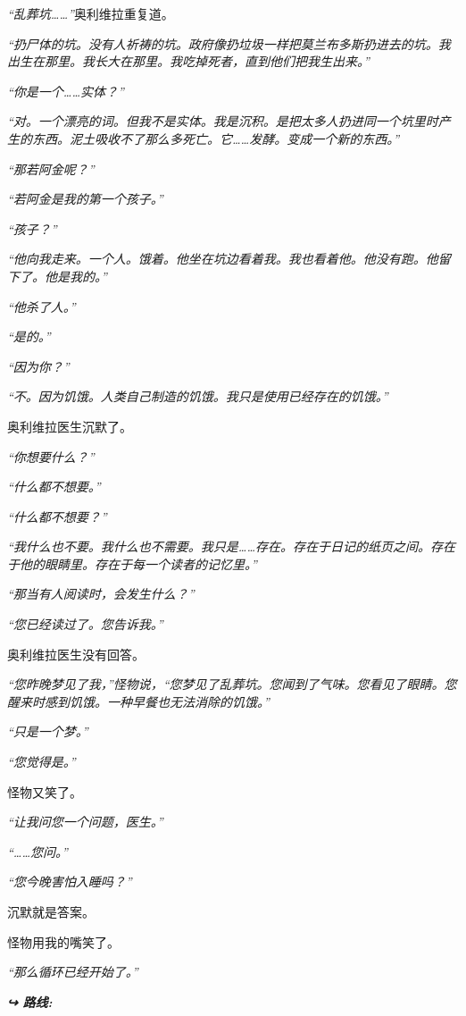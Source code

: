 \noindent \textit{“乱葬坑……”}奥利维拉重复道。

\noindent \textit{“扔尸体的坑。没有人祈祷的坑。政府像扔垃圾一样把莫兰布多斯扔进去的坑。我出生在那里。我长大在那里。我吃掉死者，直到他们把我生出来。”}

\noindent \textit{“你是一个……实体？”}

\noindent \textit{“对。一个漂亮的词。但我不是实体。我是沉积。是把太多人扔进同一个坑里时产生的东西。泥土吸收不了那么多死亡。它……发酵。变成一个新的东西。”}

\noindent \textit{“那若阿金呢？”}

\noindent \textit{“若阿金是我的第一个孩子。”}

\noindent \textit{“孩子？”}

\noindent \textit{“他向我走来。一个人。饿着。他坐在坑边看着我。我也看着他。他没有跑。他留下了。他是我的。”}

\noindent \textit{“他杀了人。”}

\noindent \textit{“是的。”}

\noindent \textit{“因为你？”}

\noindent \textit{“不。因为饥饿。人类自己制造的饥饿。我只是使用已经存在的饥饿。”}

\noindent 奥利维拉医生沉默了。

\noindent \textit{“你想要什么？”}

\noindent \textit{“什么都不想要。”}

\noindent \textit{“什么都不想要？”}

\noindent \textit{“我什么也不要。我什么也不需要。我只是……存在。存在于日记的纸页之间。存在于他的眼睛里。存在于每一个读者的记忆里。”}

\noindent \textit{“那当有人阅读时，会发生什么？”}

\noindent \textit{“您已经读过了。您告诉我。”}

\noindent 奥利维拉医生没有回答。

\noindent \textit{“您昨晚梦见了我，”怪物说，“您梦见了乱葬坑。您闻到了气味。您看见了眼睛。您醒来时感到饥饿。一种早餐也无法消除的饥饿。”}

\noindent \textit{“只是一个梦。”}

\noindent \textit{“您觉得是。”}

\noindent 怪物又笑了。

\noindent \textit{“让我问您一个问题，医生。”}

\noindent \textit{“……您问。”}

\noindent \textit{“您今晚害怕入睡吗？”}

\noindent 沉默就是答案。

\noindent 怪物用我的嘴笑了。

\noindent \textit{“那么循环已经开始了。”}

\vspace{0.5em}
\noindent\textit{\textbf{↪ 路线:}  \rotasep {} \rotasep {}}
